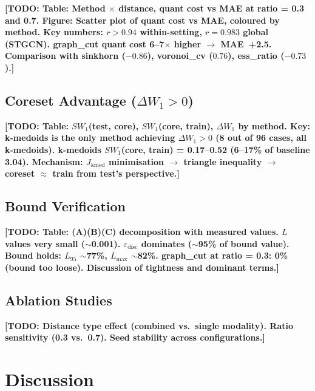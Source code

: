 \documentclass[journal]{IEEEtran}
\newcommand{\Wone}{W_1}
\newcommand{\edisc}{\varepsilon_{\mathrm{disc}}}
\newcommand{\Jkmed}{J_{\mathrm{kmed}}}
\newcommand{\todo}[1]{{\color{red}\textbf{[TODO: #1]}}}
\begin{document}
\todo{Table: Method $\times$ distance, quant cost vs MAE at
ratio = 0.3 and 0.7.
Figure: Scatter plot of quant cost vs MAE, coloured by method.
Key numbers: $r > 0.94$ within-setting, $r = 0.983$ global (STGCN).
graph\_cut quant cost 6--7$\times$ higher $\to$ MAE~+2.5.
Comparison with sinkhorn ($-0.86$), voronoi\_cv ($0.76$),
ess\_ratio ($-0.73$).}

\subsection{Coreset Advantage ($\Delta \Wone > 0$)}
\label{sec:exp-advantage}

\todo{Table: $SW_1$(test, core), $SW_1$(core, train), $\Delta W_1$
by method.
Key: k-medoids is the only method achieving $\Delta W_1 > 0$
(8 out of 96 cases, all k-medoids).
k-medoids $SW_1$(core, train) = 0.17--0.52
(6--17\% of baseline 3.04).
Mechanism: $\Jkmed$ minimisation $\to$ triangle inequality $\to$
coreset $\approx$ train from test's perspective.}

\subsection{Bound Verification}
\label{sec:exp-bound}

\todo{Table: (A)(B)(C) decomposition with measured values.
$L$ values very small ($\sim$0.001).
$\edisc$ dominates ($\sim$95\% of bound value).
Bound holds: $L_{95}$ $\sim$77\%, $L_{\max}$ $\sim$82\%.
graph\_cut at ratio = 0.3: 0\% (bound too loose).
Discussion of tightness and dominant terms.}

\subsection{Ablation Studies}
\label{sec:exp-ablation}

\todo{Distance type effect (combined vs.\ single modality).
Ratio sensitivity (0.3 vs.\ 0.7).
Seed stability across configurations.}


\section{Discussion}
\label{sec:discussion}
\end{document}
